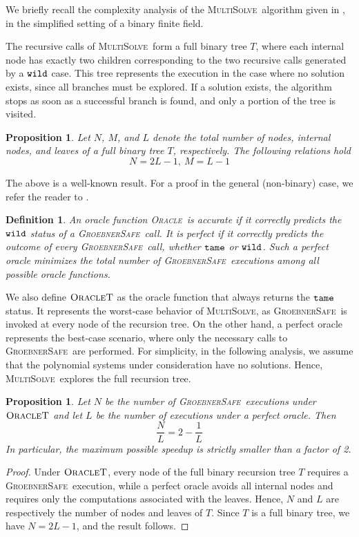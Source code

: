 \documentclass{amsart}
\newtheorem{proposition}[theorem]{Proposition}
\newtheorem{definition}[theorem]{Definition}
\def\GBSafe{{\textsc{GroebnerSafe}}}
\def\MultiSolve{{\textsc{MultiSolve}}}
\def\Oracle{{\textsc{Oracle}}}
\def\OracleT{{\textsc{OracleT}}}
\def\tame{{\tt tame}}
\def\wild{{\tt wild}}
\begin{document}
We briefly recall the complexity analysis of the \MultiSolve\ algorithm
given in \cite{LST}, in the simplified setting of a binary finite field.

The recursive calls of \MultiSolve\ form a full binary tree $T$, where
each internal node has exactly two children corresponding to the two recursive
calls generated by a $\wild$ case. This tree represents the execution in the
case where no solution exists, since all branches must be explored. If a
solution exists, the algorithm stops as soon as a successful branch is found,
and only a portion of the tree is visited.

\begin{proposition}
Let $N$, $M$, and $L$ denote the total number of nodes, internal nodes,
and leaves of a full binary tree $T$, respectively. The following relations
hold
\[
N = 2L - 1,\ M = L - 1
\]
\end{proposition}

The above is a well-known result. For a proof in the general (non-binary)
case, we refer the reader to \cite{LST}.

\begin{definition}
An oracle function \Oracle\ is {\em accurate} if it correctly predicts
the $\wild$ status of a \GBSafe\ call. It is {\em perfect} if it
correctly predicts the outcome of every \GBSafe\ call, whether $\tame$ or
$\wild$. Such a perfect oracle minimizes the total number of \GBSafe\ executions
among all possible oracle functions.
\end{definition}

We also define $\OracleT$ as the oracle function that always returns
the $\tame$ status. It represents the worst-case behavior of \MultiSolve,
as \GBSafe\ is invoked at every node of the recursion tree. On the other
hand, a perfect oracle represents the best-case scenario, where only the
necessary calls to \GBSafe\ are performed.
For simplicity, in the following analysis, we assume that the polynomial systems
under consideration have no solutions. Hence, \MultiSolve\ explores the full
recursion tree.

\begin{proposition}
Let $N$ be the number of \GBSafe\ executions under $\OracleT$ and let $L$
be the number of executions under a perfect oracle. Then
\[
\frac{N}{L} = 2 - \frac{1}{L}
\]
In particular, the maximum possible speedup is strictly smaller than
a factor of 2.
\end{proposition}

\begin{proof}
Under $\OracleT$, every node of the full binary recursion tree $T$ requires
a \GBSafe\ execution, while a perfect oracle avoids all internal nodes and
requires only the computations associated with the leaves. Hence, $N$ and
$L$ are respectively the number of nodes and leaves of $T$. Since $T$ is
a full binary tree, we have $N = 2L - 1$, and the result follows.
\end{proof}
\end{document}

